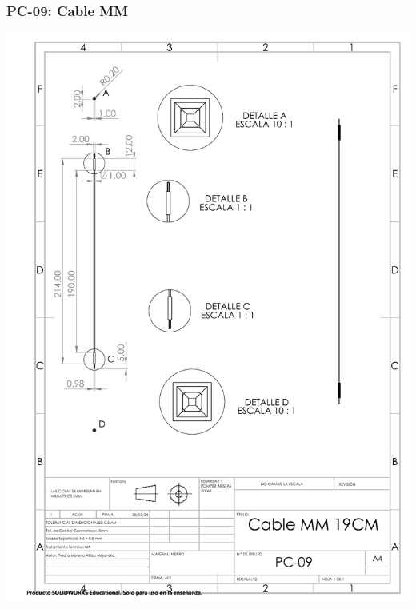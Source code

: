 \subsubsection{PC-09: Cable MM }
\begin{center}
\includegraphics[width=.85\textwidth]{22/img/cableMMDibujo.PDF}~\\[15cm]
\end{center}

